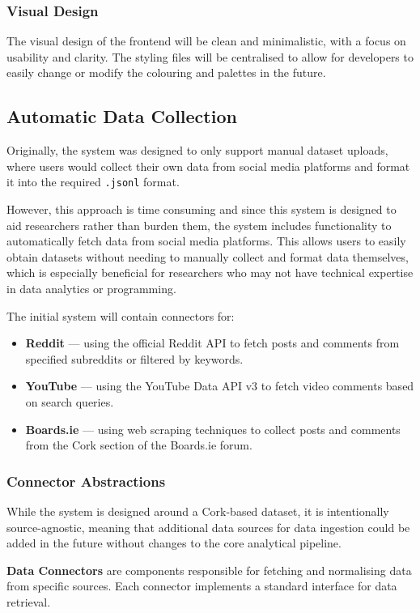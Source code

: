 \documentclass[12pt, a4paper]{article}
\begin{document}
\subsubsection{Visual Design}
The visual design of the frontend will be clean and minimalistic, with a focus on usability and clarity. The styling files will be centralised to allow for developers to easily change or modify the colouring and palettes in the future. 

\subsection{Automatic Data Collection}
Originally, the system was designed to only support manual dataset uploads, where users would collect their own data from social media platforms and format it into the required \texttt{.jsonl} format. 

However, this approach is time consuming and since this system is designed to aid researchers rather than burden them, the system includes functionality to automatically fetch data from social media platforms. This allows users to easily obtain datasets without needing to manually collect and format data themselves, which is especially beneficial for researchers who may not have technical expertise in data analytics or programming.

The initial system will contain connectors for:
\begin{itemize}
    \item \textbf{Reddit} — using the official Reddit API to fetch posts and comments from specified subreddits or filtered by keywords.
    \item \textbf{YouTube} — using the YouTube Data API v3 to fetch video comments based on search queries.
    \item \textbf{Boards.ie} — using web scraping techniques to collect posts and comments from the Cork section of the Boards.ie forum.
\end{itemize}

\subsubsection{Connector Abstractions}
While the system is designed around a Cork-based dataset, it is intentionally source-agnostic, meaning that additional data sources for data ingestion could be added in the future without changes to the core analytical pipeline.

\textbf{Data Connectors} are components responsible for fetching and normalising data from specific sources. Each connector implements a standard interface for data retrieval.
\end{document}
